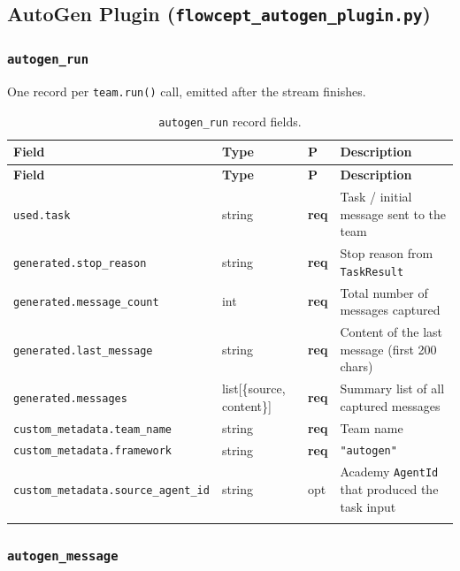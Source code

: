 \documentclass[11pt,a4paper]{article}
\newcommand{\opt}{\textcolor{optred}{opt}}
\newcommand{\req}{\textbf{req}}
\newcommand{\subtype}[1]{\texttt{\textcolor{subtypeblue}{#1}}}
\begin{document}
\subsection{AutoGen Plugin (\texttt{flowcept\_autogen\_plugin.py})}

\subsubsection{\subtype{autogen\_run}}

One record per \texttt{team.run()} call, emitted after the stream finishes.

\begin{longtable}{L{4cm} L{2.5cm} C{1.2cm} L{6.5cm}}
\toprule
\textbf{Field} & \textbf{Type} & \textbf{P} & \textbf{Description} \\
\midrule
\endfirsthead
\toprule \textbf{Field} & \textbf{Type} & \textbf{P} & \textbf{Description} \\
\midrule
\endhead
\bottomrule
\endlastfoot

\texttt{used.task}
  & string & \req & Task / initial message sent to the team \\
\texttt{generated.stop\_reason}
  & string & \req & Stop reason from \texttt{TaskResult} \\
\texttt{generated.message\_count}
  & int    & \req & Total number of messages captured \\
\texttt{generated.last\_message}
  & string & \req & Content of the last message (first 200 chars) \\
\texttt{generated.messages}
  & list[\{source, content\}] & \req
  & Summary list of all captured messages \\
\texttt{custom\_metadata.team\_name}       & string & \req & Team name \\
\texttt{custom\_metadata.framework}        & string & \req & \texttt{"autogen"} \\
\texttt{custom\_metadata.source\_agent\_id}& string & \opt
  & Academy \texttt{AgentId} that produced the task input \\

\caption{\subtype{autogen\_run} record fields.}
\end{longtable}

\subsubsection{\subtype{autogen\_message}}
\end{document}

